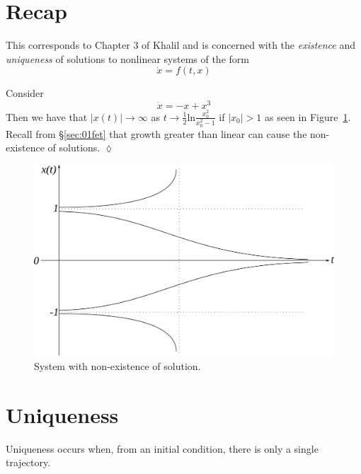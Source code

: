 
\mainmatter%
\setcounter{page}{1}

\lectureseries[\course]{\course}

\date{January 14, 2010}

\setaddress%

\setcounter{lecture}{3}
\setcounter{chapter}{3}


\section{Recap}
This corresponds to Chapter 3 of Khalil and is concerned with the \textit{existence} and \textit{uniqueness} of solutions to nonlinear systems of the form
$$\dot{x} = f(t,x)$$

\begin{example}
Consider
$$\dot{x} = -x + x^3$$
Then we have that $|x(t)|\to\infty$ as $t\to\tfrac{1}{2}\text{ln}\frac{x_0^2}{x_0^2-1}$ if $|x_0|>1$ as seen in Figure~\ref{fig:04nonexist}. Recall from \S\ref{sec:01fet} that growth greater than linear can cause the non-existence of solutions.
$\lozenge$
\end{example}

\begin{figure}[ht!]
\centering
\includegraphics[width=.5\textwidth]{images/04nonexist}
\caption{System with non-existence of solution.}
\label{fig:04nonexist}
\end{figure}

\section{Uniqueness}
Uniqueness occurs when, from an initial condition, there is only a single trajectory.

